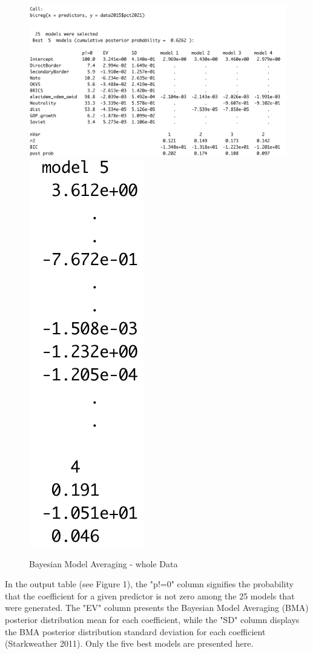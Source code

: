 \documentclass[12pt,a4paper]{article}
\begin{document}
\begin{figure}[h]
\center
\label{F:2}
\includegraphics[scale=0.5]{BMA_results}
\includegraphics[scale=0.5]{BMA_results_2}
\caption{Bayesian Model Averaging - whole Data}
\end{figure}

In the output table (see Figure 1), the "p!=0" column signifies the probability that the coefficient for a given predictor is not zero among the 25 models that were generated. The "EV" column presents the Bayesian Model Averaging (BMA) posterior distribution mean for each coefficient, while the "SD" column displays the BMA posterior distribution standard deviation for each coefficient (Starkweather 2011). Only the five best models are presented here. \\
\end{document}
